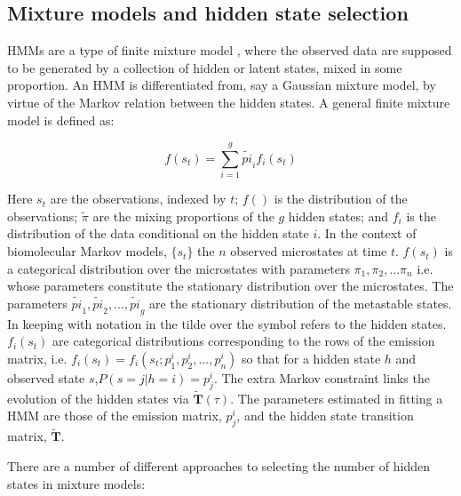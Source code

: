 \subsection{Mixture models and  hidden state selection}

HMMs are a type of finite mixture model \cite{mclachlanFiniteMixtureModels2000}, where the observed data are supposed to be generated by a collection of hidden or latent states, mixed in some proportion. An HMM is differentiated from, say a Gaussian mixture model, by virtue of the Markov relation between the hidden states. A general finite mixture model is defined as: 

\begin{equation}
    f(s_{t}) = \sum_{i=1}^{g}\tilde{pi}_{i} f_{i}(s_{t})
\end{equation}

Here $s_{t}$ are the observations, indexed by $t$; $f()$ is the distribution of the observations; $\tilde{\pi}$ are the mixing proportions of the $g$ hidden states; and $f_{i}$ is the distribution of the data  conditional on the hidden state $i$. In the context of biomolecular Markov models, $\{s_t\}$ the $n$ observed microstates at time $t$. $f(s_{t})$ is a categorical distribution over the  microstates with parameters $\pi_1, \pi_2, ... \pi_n$ i.e. whose parameters constitute the stationary distribution over the microstates. The parameters  $\tilde{pi}_{1},\tilde{pi}_{2}, ..., \tilde{pi}_{g}$ are the stationary distribution of the metastable states. In keeping with notation in \cite{noeProjectedHiddenMarkov2013a} the tilde over the symbol refers to the hidden states.  $f_{i}(s_t)$ are categorical distributions corresponding to the rows of the emission matrix, i.e. $f_{i}(s_t)= f_{i}(s_t; p^{i}_1, p^{i}_2, ..., p^{i}_n)$ so that for a hidden state $h$ and observed state $s$,$P(s=j|h=i) = p^{i}_{j}$. The extra Markov constraint links the evolution of the hidden states via $\tilde{\mathbf{T}}(\tau)$. The parameters estimated in fitting a HMM are those of the emission matrix, $p^{i}_{j}$, and the hidden state transition matrix, $\tilde{\mathbf{T}}$.

There are a number of different approaches to selecting the number of hidden states in mixture models: 

